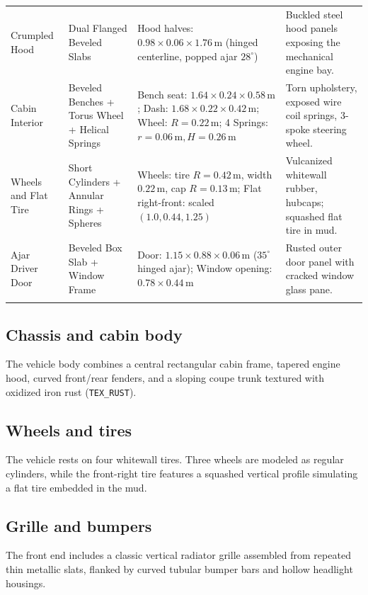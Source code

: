 \documentclass[10pt,a4paper,oneside]{article}
\begin{document}
\begin{longtable}{>{\raggedright\arraybackslash}p{}>{\raggedright\arraybackslash}p{}>{\raggedright\arraybackslash}p{}>{\raggedright\arraybackslash}p{}}
Crumpled Hood & Dual Flanged Beveled Slabs & 2 Hood halves: $0.98\times 0.06\times 1.76\,\mathrm{m}$ (hinged centerline, popped ajar $28^\circ$) & Buckled steel hood panels exposing the mechanical engine bay.\\\addlinespace[3pt]

Cabin Interior & Beveled Benches + Torus Wheel + Helical Springs & Bench seat: $1.64\times 0.24\times 0.58\,\mathrm{m}$; Dash: $1.68\times 0.22\times 0.42\,\mathrm{m}$; Wheel: $R=0.22\,\mathrm{m}$; 4 Springs: $r=0.06\,\mathrm{m}, H=0.26\,\mathrm{m}$ & Torn upholstery, exposed wire coil springs, 3-spoke steering wheel.\\\addlinespace[3pt]

Wheels and Flat Tire & Short Cylinders + Annular Rings + Spheres & 3 Wheels: tire $R=0.42\,\mathrm{m}$, width $0.22\,\mathrm{m}$, cap $R=0.13\,\mathrm{m}$; Flat right-front: scaled $(1.0, 0.44, 1.25)$ & Vulcanized whitewall rubber, hubcaps; squashed flat tire in mud.\\\addlinespace[3pt]

Ajar Driver Door & Beveled Box Slab + Window Frame & Door: $1.15\times 0.88\times 0.06\,\mathrm{m}$ ($35^\circ$ hinged ajar); Window opening: $0.78\times 0.44\,\mathrm{m}$ & Rusted outer door panel with cracked window glass pane.\\\addlinespace[3pt]

\bottomrule\end{longtable}

\subsection{Chassis and cabin body}
The vehicle body combines a central rectangular cabin frame, tapered engine hood, curved front/rear fenders, and a sloping coupe trunk textured with oxidized iron rust (\texttt{TEX\_RUST}).

\subsection{Wheels and tires}
The vehicle rests on four whitewall tires. Three wheels are modeled as regular cylinders, while the front-right tire features a squashed vertical profile simulating a flat tire embedded in the mud.

\subsection{Grille and bumpers}
The front end includes a classic vertical radiator grille assembled from repeated thin metallic slats, flanked by curved tubular bumper bars and hollow headlight housings.
\end{document}
